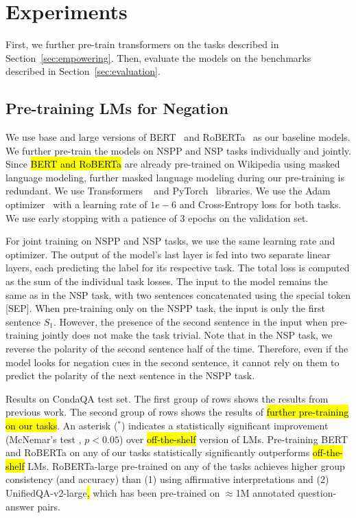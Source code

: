 \section{Experiments}

First, we further pre-train transformers on the tasks described in Section~\ref{sec:empowering}.
Then, evaluate the models on the benchmarks described in Section~\ref{sec:evaluation}.
    
\subsection{Pre-training LMs for Negation}
We use base and large versions of {BERT}~\cite{devlin-etal-2019-bert} and {RoBERTa}~\cite{liu2019roberta} as our baseline models.
We further pre-train the models on NSPP and NSP tasks individually and jointly.
Since \hl{{BERT} and {RoBERTa}} are already pre-trained on Wikipedia using masked language modeling, further masked language modeling during our pre-training is redundant.
We use Transformers ~\cite{wolf-etal-2020-transformers}
and PyTorch~\cite{paszke2019pytorch} libraries.
We use the Adam optimizer~\cite{kingma2017adam} with a learning rate of $1e-6$
and Cross-Entropy loss for both tasks. 
We use early stopping with a patience of 3 epochs on the validation set. 


For joint training on NSPP and NSP tasks, we use the same learning rate and optimizer. 
The output of the model's last layer is fed into two separate linear layers,
each predicting the label for its respective task. 
The total loss is computed as the sum of the individual task losses. 
The input to the model remains the same as in the NSP task, 
with two sentences concatenated using the special token [SEP].
When pre-training only on the NSPP task, the input is only the first sentence $S_1$.
However, 
the presence of the second sentence in the input when pre-training jointly does not make the task trivial.
Note that in the NSP task, we reverse the polarity of the second sentence half of the time.
Therefore, even if the model looks for negation cues in the second sentence,
it cannot rely on them to predict the polarity of the next sentence in the NSPP task.
\begin{table*}[t]
    \centering
    
    \caption{
        Results on CondaQA test set.
        The first group of rows shows the results from previous work.
        The second group of rows shows the results of \hl{further pre-training on our tasks}.
        An asterisk ($^{\ast}$) indicates a statistically significant improvement (McNemar's test \cite{mcnemar1947note}, $p < 0.05$)
        over \hl{off-the-shelf} version of LMs.
        Pre-training {BERT} and {RoBERTa} on any of our tasks statistically significantly outperforms \hl{off-the-shelf} LMs.
        {RoBERTa-large} pre-trained on any of the tasks achieves higher group consistency (and accuracy)
        than (1) using affirmative interpretations
        and (2) {UnifiedQA-v2-large}\hl{,} which has been pre-trained on $\approx$1M annotated question-answer pairs.
        \label{tab:condaqaresults}
    }
\end{table*}

